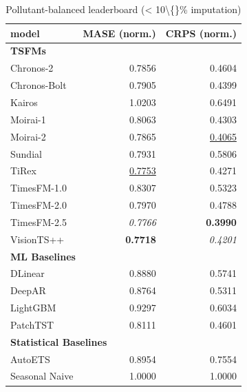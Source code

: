 \begin{table}[H]
\caption{Pollutant-balanced leaderboard (\textless{} 10\textbackslash\{\}\% imputation)}
\centering
\begin{small}
\begin{tabular}{lrr}
\toprule
model & MASE (norm.) & CRPS (norm.) \\
\midrule
\multicolumn{3}{l}{\textbf{TSFMs}} \\
Chronos-2 & 0.7856 & 0.4604 \\
Chronos-Bolt & 0.7905 & 0.4399 \\
Kairos & 1.0203 & 0.6491 \\
Moirai-1 & 0.8063 & 0.4303 \\
Moirai-2 & 0.7865 & \underline{0.4065} \\
Sundial & 0.7931 & 0.5806 \\
TiRex & \underline{0.7753} & 0.4271 \\
TimesFM-1.0 & 0.8307 & 0.5323 \\
TimesFM-2.0 & 0.7970 & 0.4788 \\
TimesFM-2.5 & \textit{0.7766} & \textbf{0.3990} \\
VisionTS++ & \textbf{0.7718} & \textit{0.4201} \\
\midrule
\multicolumn{3}{l}{\textbf{ML Baselines}} \\
DLinear & 0.8880 & 0.5741 \\
DeepAR & 0.8764 & 0.5311 \\
LightGBM & 0.9297 & 0.6034 \\
PatchTST & 0.8111 & 0.4601 \\
\midrule
\multicolumn{3}{l}{\textbf{Statistical Baselines}} \\
AutoETS & 0.8954 & 0.7554 \\
Seasonal Naive & 1.0000 & 1.0000 \\
\bottomrule
\end{tabular}
\end{small}
\end{table}